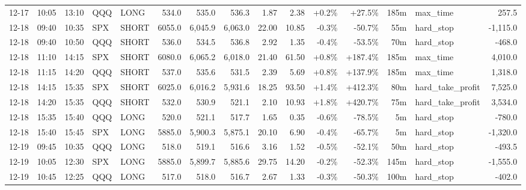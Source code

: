 \documentclass[11pt,a4paper,twoside]{article}
\begin{document}
\begin{landscape}
\begin{center}
\begin{longtable}{>{\color{txtmain}}l l l l l r r r r r r r r >{\color{txtmain}}l r}
12-17 & 10:05 & 13:10 & QQQ & LONG & 534.0 & 535.0 & 536.3 & 1.87 & 2.38 & \textcolor{wingreen}{+0.2\%} & \textcolor{wingreen}{+27.5\%} & 185m & max\_time & \textcolor{wingreen}{257.5} \\
12-18 & 09:40 & 10:35 & SPX & SHORT & 6055.0 & 6,045.9 & 6,063.0 & 22.00 & 10.85 & \textcolor{lossred}{-0.3\%} & \textcolor{lossred}{-50.7\%} & 55m & hard\_stop & \textcolor{lossred}{-1,115.0} \\
12-18 & 09:40 & 10:50 & QQQ & SHORT & 536.0 & 534.5 & 536.8 & 2.92 & 1.35 & \textcolor{lossred}{-0.4\%} & \textcolor{lossred}{-53.5\%} & 70m & hard\_stop & \textcolor{lossred}{-468.0} \\
12-18 & 11:10 & 14:15 & SPX & SHORT & 6080.0 & 6,065.2 & 6,018.0 & 21.40 & 61.50 & \textcolor{wingreen}{+0.8\%} & \textcolor{wingreen}{+187.4\%} & 185m & max\_time & \textcolor{wingreen}{4,010.0} \\
12-18 & 11:15 & 14:20 & QQQ & SHORT & 537.0 & 535.6 & 531.5 & 2.39 & 5.69 & \textcolor{wingreen}{+0.8\%} & \textcolor{wingreen}{+137.9\%} & 185m & max\_time & \textcolor{wingreen}{1,318.0} \\
12-18 & 14:15 & 15:35 & SPX & SHORT & 6025.0 & 6,016.2 & 5,931.6 & 18.25 & 93.50 & \textcolor{wingreen}{+1.4\%} & \textcolor{wingreen}{+412.3\%} & 80m & hard\_take\_profit & \textcolor{wingreen}{7,525.0} \\
12-18 & 14:20 & 15:35 & QQQ & SHORT & 532.0 & 530.9 & 521.1 & 2.10 & 10.93 & \textcolor{wingreen}{+1.8\%} & \textcolor{wingreen}{+420.7\%} & 75m & hard\_take\_profit & \textcolor{wingreen}{3,534.0} \\
12-18 & 15:35 & 15:40 & QQQ & LONG & 520.0 & 521.1 & 517.7 & 1.65 & 0.35 & \textcolor{lossred}{-0.6\%} & \textcolor{lossred}{-78.5\%} & 5m & hard\_stop & \textcolor{lossred}{-780.0} \\
12-18 & 15:40 & 15:45 & SPX & LONG & 5885.0 & 5,900.3 & 5,875.1 & 20.10 & 6.90 & \textcolor{lossred}{-0.4\%} & \textcolor{lossred}{-65.7\%} & 5m & hard\_stop & \textcolor{lossred}{-1,320.0} \\
12-19 & 09:45 & 10:35 & QQQ & LONG & 518.0 & 519.1 & 516.6 & 3.16 & 1.52 & \textcolor{lossred}{-0.5\%} & \textcolor{lossred}{-52.1\%} & 50m & hard\_stop & \textcolor{lossred}{-493.5} \\
12-19 & 10:05 & 12:30 & SPX & LONG & 5885.0 & 5,899.7 & 5,885.6 & 29.75 & 14.20 & \textcolor{lossred}{-0.2\%} & \textcolor{lossred}{-52.3\%} & 145m & hard\_stop & \textcolor{lossred}{-1,555.0} \\
12-19 & 10:45 & 12:25 & QQQ & LONG & 517.0 & 518.0 & 516.7 & 2.67 & 1.33 & \textcolor{lossred}{-0.3\%} & \textcolor{lossred}{-50.3\%} & 100m & hard\_stop & \textcolor{lossred}{-402.0} \\

\end{longtable}
\end{center}
\end{landscape}
\end{document}
